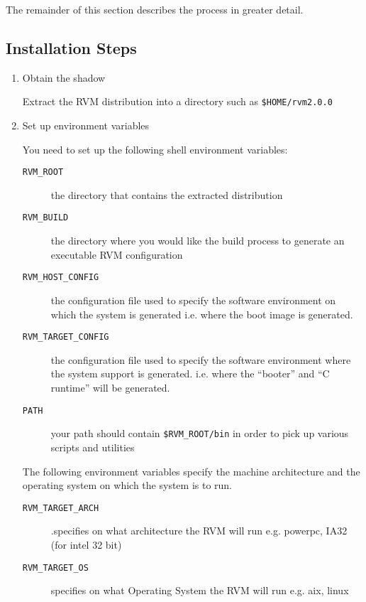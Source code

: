 The remainder of this section describes the process in greater detail.

\subsection{Installation Steps}

\begin{enumerate}
\item Obtain the shadow

Extract the RVM distribution into
a directory such as {\tt \$HOME/rvm2.0.0}

\item Set up environment variables

You need to set up the following shell environment variables:

\begin{description}
\item [{\tt RVM\_ROOT}] the directory that contains the extracted
distribution 
\item [{\tt RVM\_BUILD}] the directory where you would like the build
process to generate an executable RVM configuration

\item [{\tt RVM\_HOST\_CONFIG}] the configuration file used to specify
the software environment on which the system is generated i.e. where the
boot image is generated.

\item [{\tt RVM\_TARGET\_CONFIG}] the configuration file used to specify
the software environment where the system support is generated. i.e. where
the ``booter'' and ``C runtime'' will be generated.

\item[{\tt PATH}] your path should contain {\tt \$RVM\_ROOT/bin} in
order to pick up various scripts and utilities
\end{description}

The following environment variables specify the machine architecture and
the operating system on which the system is to run.
\begin{description}

\item [{\tt RVM\_TARGET\_ARCH}].specifies on what architecture
the RVM will run e.g.  powerpc, IA32 (for intel 32 bit)

\item [{\tt RVM\_TARGET\_OS}] specifies on what Operating System
the RVM will run e.g. aix, linux


\end{description}
\end{enumerate}
